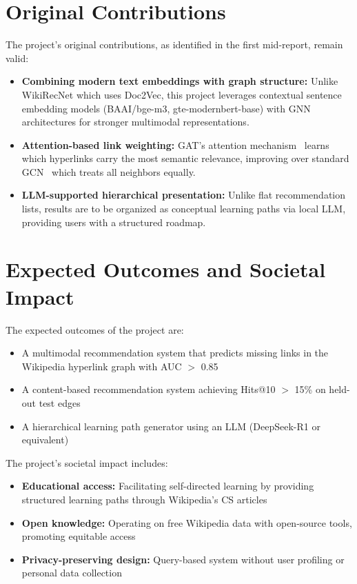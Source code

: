 \section{Original Contributions}

The project's original contributions, as identified in the first mid-report, remain valid:

\begin{itemize}
    \item \textbf{Combining modern text embeddings with graph structure:} Unlike WikiRecNet \cite{wikirecnet2020} which uses Doc2Vec, this project leverages contextual sentence embedding models (BAAI/bge-m3, gte-modernbert-base) with GNN architectures for stronger multimodal representations.
    \item \textbf{Attention-based link weighting:} GAT's attention mechanism~\cite{velickovic2018graph} learns which hyperlinks carry the most semantic relevance, improving over standard GCN~\cite{kipf2017semi} which treats all neighbors equally.
    \item \textbf{LLM-supported hierarchical presentation:} Unlike flat recommendation lists, results are to be organized as conceptual learning paths via local LLM, providing users with a structured roadmap.
\end{itemize}

\section{Expected Outcomes and Societal Impact}

The expected outcomes of the project are:

\begin{itemize}
    \item A multimodal recommendation system that predicts missing links in the Wikipedia hyperlink graph with AUC $>$ 0.85
    \item A content-based recommendation system achieving Hits@10 $>$ 15\% on held-out test edges
    \item A hierarchical learning path generator using an LLM (DeepSeek-R1 or equivalent)
\end{itemize}

The project's societal impact includes:
\begin{itemize}
    \item \textbf{Educational access:} Facilitating self-directed learning by providing structured learning paths through Wikipedia's CS articles
    \item \textbf{Open knowledge:} Operating on free Wikipedia data with open-source tools, promoting equitable access
    \item \textbf{Privacy-preserving design:} Query-based system without user profiling or personal data collection
\end{itemize}
